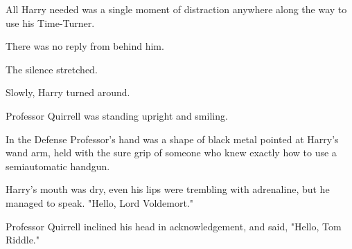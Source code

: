 All Harry needed was a single moment of distraction anywhere along the way to 
use his Time-Turner.

There was no reply from behind him.

The silence stretched.

Slowly, Harry turned around.

Professor Quirrell was standing upright and smiling.

In the Defense Professor's hand was a shape of black metal pointed at Harry's 
wand arm, held with the sure grip of someone who knew exactly how to use a 
semiautomatic handgun.

Harry's mouth was dry, even his lips were trembling with adrenaline, but he 
managed to speak. "Hello, Lord Voldemort."

Professor Quirrell inclined his head in acknowledgement, and said, "Hello, Tom 
Riddle."
